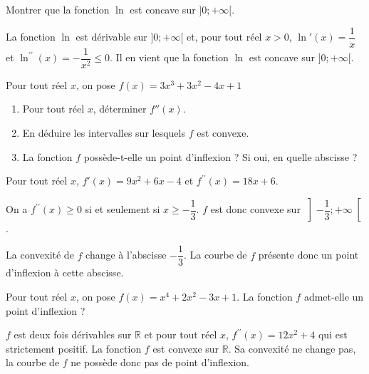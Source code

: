 \documentclass[11pt,fleqn, openany]{book} %
\begin{document}
\begin{exercise}[topic=cvx02]Montrer que la fonction $\ln$ est concave sur $]0;+\infty[$.\end{exercise}

\begin{solution}La fonction \(\ln\) est dérivable sur \(]0;+\infty[\) et, pour tout réel \(x>0\), \(\ln '(x)=\dfrac{1}{x}\) et \(\ln^{\prime\prime}(x)=-\dfrac{1}{x^2}\leqslant 0\). Il en vient que la fonction \(\ln\) est concave sur \(]0;+\infty[\).\end{solution}



\begin{exercise}[topic=cvx02]Pour tout réel $x$, on pose $f(x)=3x^3+3x^2-4x+1$
\begin{enumerate}
\item Pour tout réel $x$, déterminer $f''(x)$.
\item En déduire les intervalles sur lesquels $f$ est convexe.
\item La fonction $f$ possède-t-elle un point d'inflexion ? Si oui, en quelle abscisse ?
\end{enumerate}\end{exercise}

\begin{solution}
Pour tout réel \(x\), \(f'(x)=9x^2+6x-4\) et \(f^{\prime\prime}(x)=18x+6\).

On a \(f^{\prime\prime}(x)\geqslant 0\) si et seulement si \(x \geqslant - \dfrac{1}{3}\). \(f\) est donc convexe sur \(\left]-\dfrac{1}{3};+\infty\right[\).

La convexité de \(f\) change à l'abscisse \(-\dfrac{1}{3}\). La courbe de \(f\) présente donc un point d'inflexion à cette abscisse.\end{solution}



\begin{exercise}[topic=cvx02]Pour tout réel $x$, on pose $f(x)=x^4+2x^2-3x+1$. La fonction $f$ admet-elle un point d'inflexion ?\newpage \end{exercise}

\begin{solution}
\(f\) est deux fois dérivables sur \(\mathbb{R}\) et pour tout réel \(x\), \(f^{\prime\prime}(x)=12x^2+4\) qui est strictement positif. La fonction \(f\) est convexe sur \(\mathbb{R}\). Sa convexité ne change pas, la courbe de \(f\) ne possède donc pas de point d'inflexion.\end{solution}
\end{document}

